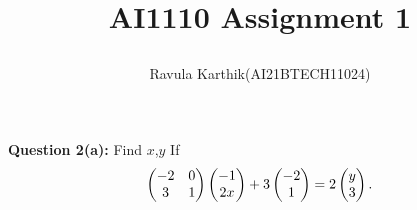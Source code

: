 \documentclass[journal,12pt,twocolumn]{IEEEtran}
\begin{document}
	\let\StandardTheFigure\thefigure
	\let\vec\mathbf
	
		
		
		
		\def\putbox#1#2#3{\makebox[0in][l]{\makebox[#1][l]{}\raisebox{\baselineskip}[0in][0in]{\raisebox{#2}[0in][0in]{#3}}}}
		\def\rightbox#1{\makebox[0in][r]{#1}}
		\def\centbox#1{\makebox[0in]{#1}}
		\def\topbox#1{\raisebox{-\baselineskip}[0in][0in]{#1}}
		\def\midbox#1{\raisebox{-0.5\baselineskip}[0in][0in]{#1}}
		
		
		\title{
			AI1110 Assignment 1 
			
		}
		\author{ 
			Ravula Karthik(AI21BTECH11024)
		}	
		
		\maketitle
		\newpage
		\bigskip
		\textbf{Question 2(a):}
		Find $x$,$ y $       
		If 
		\begin{align}
			\begin{pmatrix}-2 & 0\\3 & 1\end{pmatrix}
			\begin{pmatrix}-1\\2x\end{pmatrix} +3  
			\begin{pmatrix}-2 \\1 \end{pmatrix} =2 
			\begin{pmatrix}y \\3 \end{pmatrix} .
		\end{align}
		
\end{document}
